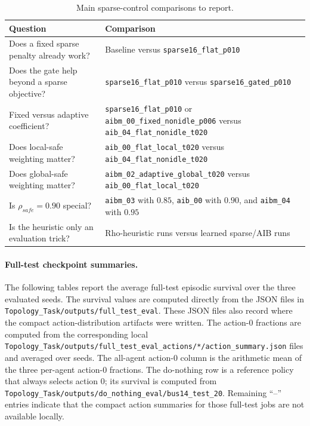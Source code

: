 \begin{table}[htbp]
  \centering
  \small
  \caption{Main sparse-control comparisons to report.}
  \label{tab:sparse-control-main-comparisons}
  \setlength{\tabcolsep}{4pt}
  \begin{tabular}{L{0.45\textwidth}L{0.45\textwidth}}
    \toprule
    Question & Comparison \\
    \midrule
    Does a fixed sparse penalty already work? &
    Baseline versus \texttt{sparse16\_flat\_p010} \\
    Does the gate help beyond a sparse objective? &
    \texttt{sparse16\_flat\_p010} versus \texttt{sparse16\_gated\_p010} \\
    Fixed versus adaptive coefficient? &
    \texttt{sparse16\_flat\_p010} or \texttt{aibm\_00\_fixed\_nonidle\_p006}
    versus \texttt{aib\_04\_flat\_nonidle\_t020} \\
    Does local-safe weighting matter? &
    \texttt{aib\_00\_flat\_local\_t020} versus
    \texttt{aib\_04\_flat\_nonidle\_t020} \\
    Does global-safe weighting matter? &
    \texttt{aibm\_02\_adaptive\_global\_t020} versus
    \texttt{aib\_00\_flat\_local\_t020} \\
    Is \(\rho_{safe}=0.90\) special? &
    \texttt{aibm\_03} with \(0.85\), \texttt{aib\_00} with \(0.90\),
    and \texttt{aibm\_04} with \(0.95\) \\
    Is the heuristic only an evaluation trick? &
    Rho-heuristic runs versus learned sparse/AIB runs \\
    \bottomrule
  \end{tabular}
\end{table}

\paragraph{Full-test checkpoint summaries.}
The following tables report the average full-test episodic survival over the
three evaluated seeds. The survival values are computed directly from the JSON
files in \texttt{Topology\_Task/outputs/full\_test\_eval}. These JSON files also
record where the compact action-distribution artifacts were written. The
action-0 fractions are computed from the corresponding local
\texttt{Topology\_Task/outputs/full\_test\_eval\_actions/*/action\_summary.json}
files and averaged over seeds. The all-agent action-0 column is the arithmetic
mean of the three per-agent action-0 fractions. The do-nothing row is a
reference policy that always selects action 0; its survival is computed from
\texttt{Topology\_Task/outputs/do\_nothing\_eval/bus14\_test\_20}. Remaining
``--'' entries indicate that the compact action summaries for those full-test
jobs are not available locally.

